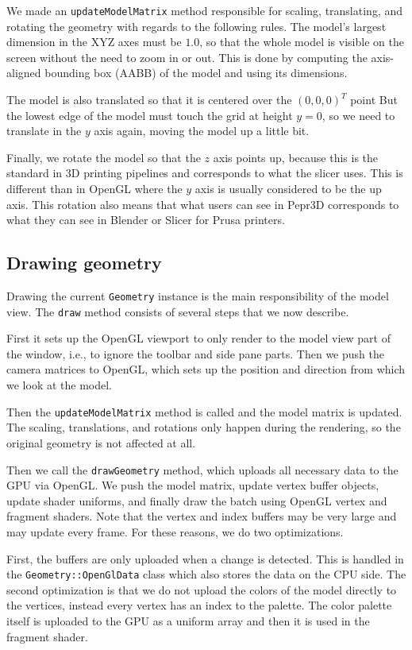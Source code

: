 We made an \texttt{updateModelMatrix} method responsible for scaling, translating, and rotating the geometry with regards to the following rules.
The model's largest dimension in the XYZ axes must be $1.0$, so that the whole model is visible on the screen without the need to zoom in or out.
This is done by computing the axis-aligned bounding box (AABB) of the model and using its dimensions.

The model is also translated so that it is centered over the $(0,0,0)^T$ point
But the lowest edge of the model must touch the grid at height $y=0$, so we need to translate in the $y$ axis again, moving the model up a little bit.

Finally, we rotate the model so that the $z$ axis points up, because this is the standard in 3D printing pipelines and corresponds to what the slicer uses.
This is different than in OpenGL where the $y$ axis is usually considered to be the up axis.
This rotation also means that what users can see in Pepr3D corresponds to what they can see in Blender or Slicer for Prusa printers.

\subsection{Drawing geometry}

Drawing the current \texttt{Geometry} instance is the main responsibility of the model view.
The \texttt{draw} method consists of several steps that we now describe.

First it sets up the OpenGL viewport to only render to the model view part of the window, i.e., to ignore the toolbar and side pane parts.
Then we push the camera matrices to OpenGL, which sets up the position and direction from which we look at the model.

Then the \texttt{updateModelMatrix} method is called and the model matrix is updated.
The scaling, translations, and rotations only happen during the rendering, so the original geometry is not affected at all.

Then we call the \texttt{drawGeometry} method, which uploads all necessary data to the GPU via OpenGL.
We push the model matrix, update vertex buffer objects, update shader uniforms, and finally draw the batch using OpenGL vertex and fragment shaders.
Note that the vertex and index buffers may be very large and may update every frame.
For these reasons, we do two optimizations.

First, the buffers are only uploaded when a change is detected.
This is handled in the \texttt{Geometry::OpenGlData} class which also stores the data on the CPU side.
The second optimization is that we do not upload the colors of the model directly to the vertices, instead every vertex has an index to the palette.
The color palette itself is uploaded to the GPU as a uniform array and then it is used in the fragment shader.

